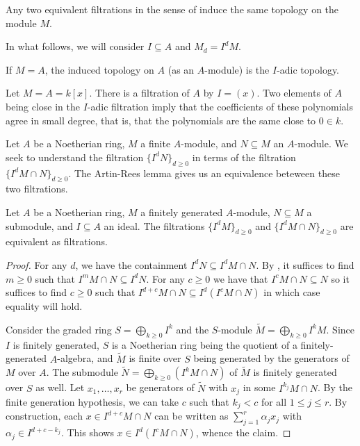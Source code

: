 \begin{remark}
    Any two equivalent filtrations in the sense of  induce the same topology on the module $M$. 
\end{remark}
In what follows, we will consider $I\subseteq A$ and $M_{d}=I^{d}M$. 
\begin{example}
    If $M=A$, the induced topology on $A$ (as an $A$-module) is the $I$-adic topology. 
\end{example}
\begin{example}
    Let $M=A=k[x]$. There is a filtration of $A$ by $I=(x)$. Two elements of $A$ being close in the $I$-adic filtration imply that the coefficients of these polynomials agree in small degree, that is, that the polynomials are the same close to $0\in k$. 
\end{example}
Let $A$ be a Noetherian ring, $M$ a finite $A$-module, and $N\subseteq M$ an $A$-module. We seek to understand the filtration $\{I^{d}N\}_{d\geq0}$ in terms of the filtration $\{I^{d}M\cap N\}_{d\geq0}$. The Artin-Rees lemma gives us an equivalence beteween these two filtrations. 
\begin{theorem}\label{thm: Artin-Rees}
    Let $A$ be a Noetherian ring, $M$ a finitely generated $A$-module, $N\subseteq M$ a submodule, and $I\subseteq A$ an ideal. The filtrations $\{I^{d}M\}_{d\geq0}$ and $\{I^{d}M\cap N\}_{d\geq0}$ are equivalent as filtrations. 
\end{theorem}
\begin{proof}
    For any $d$, we have the containment $I^{d}N\subseteq I^{d}M\cap N$. By , it suffices to find $m\geq0$ such that $I^{m}M\cap N\subseteq I^{d}N$. For any $c\geq0$ we have that $I^{c}M\cap N\subseteq N$ so it suffices to find $c\geq0$ such that $I^{d+c}M\cap N\subseteq I^{d}(I^{c}M\cap N)$ in which case equality will hold. 
    
    Consider the graded ring $S=\bigoplus_{k\geq0}I^{k}$ and the $S$-module $\widetilde{M}=\bigoplus_{k\geq0}I^{k}M$. Since $I$ is finitely generated, $S$ is a Noetherian ring being the quotient of a finitely-generated $A$-algebra, and $\widetilde{M}$ is finite over $S$ being generated by the generators of $M$ over $A$. The submodule $\widetilde{N}=\bigoplus_{k\geq0}(I^{k}M\cap N)$ of $\widetilde{M}$ is finitely generated over $S$ as well. Let $x_{1},\dots,x_{r}$ be generators of $\widetilde{N}$ with $x_{j}$ in some $I^{k_{j}}M\cap N$. By the finite generation hypothesis, we can take $c$ such that $k_{j}<c$ for all $1\leq j\leq r$. By construction, each $x\in I^{d+c}M\cap N$ can be written as $\sum_{j=1}^{r}\alpha_{j}x_{j}$ with $\alpha_{j}\in I^{d+c-k_{j}}$. This shows $x\in I^{d}(I^{c}M\cap N)$, whence the claim. 
\end{proof}

